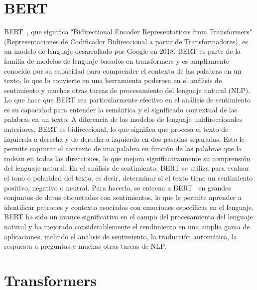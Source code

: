 
\section{BERT}

BERT~\cite{devlin2019bert}, que significa "Bidirectional Encoder Representations from Transformers"
(Representaciones de Codificador Bidireccional a partir de Transformadores),
es un modelo de lenguaje desarrollado por Google en 2018.
BERT es parte de la familia de modelos de lenguaje basados en transformers
y es ampliamente conocido por su capacidad para comprender el contexto
de las palabras en un texto, lo que lo convierte en una herramienta
poderosa en el análisis de sentimiento y muchas otras tareas de procesamiento
del lenguaje natural (NLP).
Lo que hace que BERT sea particularmente efectivo en el análisis de sentimiento
es su capacidad para entender la semántica y el significado contextual de las palabras en un texto.
A diferencia de los modelos de lenguaje unidireccionales anteriores,
BERT es bidireccional, lo que significa que procesa el texto de izquierda a derecha y
de derecha a izquierda en dos pasadas separadas.
Esto le permite capturar el contexto de una palabra en función de las
palabras que la rodean en todas las direcciones, lo que mejora significativamente
su comprensión del lenguaje natural.
En el análisis de sentimiento, BERT se utiliza para evaluar el tono
o polaridad del texto, es decir, determinar si el texto tiene un sentimiento positivo,
negativo o neutral. Para hacerlo, se entrena a BERT~\cite{BertSentimentModel1}
en grandes conjuntos de datos etiquetados con sentimientos, lo que le permite aprender
a identificar patrones y contexto asociados con emociones específicas en el lenguaje.
BERT ha sido un avance significativo en el campo del procesamiento
del lenguaje natural y ha mejorado considerablemente el rendimiento
en una amplia gama de aplicaciones, incluido el análisis de sentimiento,
la traducción automática, la respuesta a preguntas y muchas otras tareas de NLP.


\section{Transformers}


